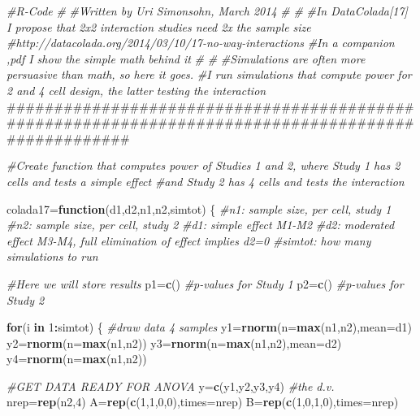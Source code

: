 \documentclass[]{article}
\newenvironment{Shaded}{\begin{snugshade}}{\end{snugshade}}
\newcommand{\KeywordTok}[1]{\textcolor[rgb]{0.13,0.29,0.53}{\textbf{#1}}}
\newcommand{\DataTypeTok}[1]{\textcolor[rgb]{0.13,0.29,0.53}{#1}}
\newcommand{\DecValTok}[1]{\textcolor[rgb]{0.00,0.00,0.81}{#1}}
\newcommand{\CommentTok}[1]{\textcolor[rgb]{0.56,0.35,0.01}{\textit{#1}}}
\newcommand{\ControlFlowTok}[1]{\textcolor[rgb]{0.13,0.29,0.53}{\textbf{#1}}}
\newcommand{\OperatorTok}[1]{\textcolor[rgb]{0.81,0.36,0.00}{\textbf{#1}}}
\newcommand{\NormalTok}[1]{#1}
\begin{document}
\begin{Shaded}
\begin{Highlighting}[]
\CommentTok{#R-Code}
\CommentTok{#}
\CommentTok{#Written by Uri Simonsohn, March 2014}
\CommentTok{#}
\CommentTok{#}
\CommentTok{#In DataColada[17] I propose that 2x2 interaction studies need 2x the sample size}
\CommentTok{#http://datacolada.org/2014/03/10/17-no-way-interactions}
\CommentTok{#In a companion ,pdf I show the simple math behind it}
\CommentTok{#}
\CommentTok{#}
\CommentTok{#Simulations are often more persuasive than math, so here it goes.}
\CommentTok{#I run simulations that compute power for 2 and 4 cell design, the latter testing the interaction}
\NormalTok{###################################################################################################}

\CommentTok{#Create function that computes power of Studies 1 and 2, where Study 1  has 2 cells and tests a simple effect}
\CommentTok{#and Study 2 has 4 cells and tests the interaction}

\NormalTok{  colada17=}\ControlFlowTok{function}\NormalTok{(d1,d2,n1,n2,simtot)}
\NormalTok{  \{}
  \CommentTok{#n1: sample size, per cell, study 1}
  \CommentTok{#n2: sample size, per cell, study 2}
  \CommentTok{#d1: simple effect M1-M2}
  \CommentTok{#d2: moderated effect M3-M4, full elimination of effect implies d2=0}
  \CommentTok{#simtot: how many simulations to run}


  \CommentTok{#Here we will store results}
\NormalTok{      p1=}\KeywordTok{c}\NormalTok{()    }\CommentTok{#p-values for Study 1}
\NormalTok{      p2=}\KeywordTok{c}\NormalTok{()    }\CommentTok{#p-values for Study 2}


  \ControlFlowTok{for}\NormalTok{(i }\ControlFlowTok{in} \DecValTok{1}\OperatorTok{:}\NormalTok{simtot) \{}
    \CommentTok{#draw data 4 samples}
\NormalTok{    y1=}\KeywordTok{rnorm}\NormalTok{(}\DataTypeTok{n=}\KeywordTok{max}\NormalTok{(n1,n2),}\DataTypeTok{mean=}\NormalTok{d1)}
\NormalTok{    y2=}\KeywordTok{rnorm}\NormalTok{(}\DataTypeTok{n=}\KeywordTok{max}\NormalTok{(n1,n2))}
\NormalTok{    y3=}\KeywordTok{rnorm}\NormalTok{(}\DataTypeTok{n=}\KeywordTok{max}\NormalTok{(n1,n2),}\DataTypeTok{mean=}\NormalTok{d2)}
\NormalTok{    y4=}\KeywordTok{rnorm}\NormalTok{(}\DataTypeTok{n=}\KeywordTok{max}\NormalTok{(n1,n2))}
    
    \CommentTok{#GET DATA READY FOR ANOVA  }
\NormalTok{      y=}\KeywordTok{c}\NormalTok{(y1,y2,y3,y4)          }\CommentTok{#the d.v.}
\NormalTok{      nrep=}\KeywordTok{rep}\NormalTok{(n2,}\DecValTok{4}\NormalTok{)          }
\NormalTok{      A=}\KeywordTok{rep}\NormalTok{(}\KeywordTok{c}\NormalTok{(}\DecValTok{1}\NormalTok{,}\DecValTok{1}\NormalTok{,}\DecValTok{0}\NormalTok{,}\DecValTok{0}\NormalTok{),}\DataTypeTok{times=}\NormalTok{nrep) }
\NormalTok{      B=}\KeywordTok{rep}\NormalTok{(}\KeywordTok{c}\NormalTok{(}\DecValTok{1}\NormalTok{,}\DecValTok{0}\NormalTok{,}\DecValTok{1}\NormalTok{,}\DecValTok{0}\NormalTok{),}\DataTypeTok{times=}\NormalTok{nrep)}
    

\end{Highlighting}
\end{Shaded}
\end{document}
